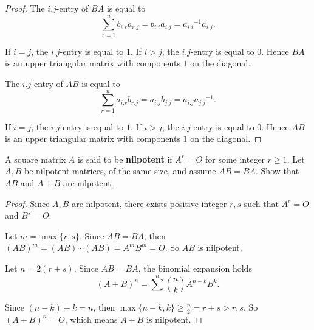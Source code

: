 \begin{proof}
    The $i.j$-entry of $BA$ is equal to
    \[
        \sum^{n}_{r=1}b_{i.r}a_{r.j} = b_{i.i}a_{i.j} = {a_{i.i}}^{-1}a_{i.j}.
    \]

    If $i = j$, the $i.j$-entry is equal to $1$. If $i > j$, the $i.j$-entry is equal to $0$. Hence $BA$ is an upper triangular matrix with components $1$ on the diagonal.

    The $i.j$-entry of $AB$ is equal to
    \[
        \sum^{n}_{r=1}a_{i.r}b_{r.j} = a_{i.j}b_{j.j} = a_{i.j}{a_{j.j}}^{-1}.
    \]

    If $i = j$, the $i.j$-entry is equal to $1$. If $i > j$, the $i.j$-entry is equal to $0$. Hence $AB$ is an upper triangular matrix with components $1$ on the diagonal.
\end{proof}

\begin{exercise}
    A square matrix $A$ is said to be \textbf{nilpotent} if $A^{r} = O$ for some integer $r\geq 1$. Let $A, B$ be nilpotent matrices, of the same size, and assume $AB = BA$. Show that $AB$ and $A + B$ are nilpotent.
\end{exercise}

\begin{proof}
    Since $A, B$ are nilpotent, there exists positive integer $r, s$ such that $A^{r} = O$ and $B^{s} = O$.

    Let $m = \max\{ r, s \}$. Since $AB = BA$, then ${(AB)}^{m} = (AB)\cdots (AB) = A^{m}B^{m} = O$. So $AB$ is nilpotent.

    Let $n = 2(r + s)$. Since $AB = BA$, the binomial expansion holds
    \[
        {(A + B)}^{n} = \sum^{n}\binom{n}{k}A^{n-k}B^{k}.
    \]

    Since $(n - k) + k = n$, then $\max\{ n - k, k \} \geq \frac{n}{2} = r + s > r, s$. So ${(A + B)}^{n} = O$, which means $A + B$ is nilpotent.
\end{proof}
